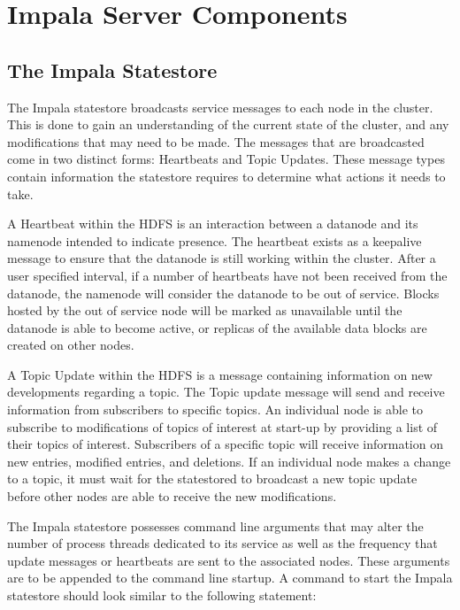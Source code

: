 \documentclass[onecolumn, draftclsnofoot,10pt, compsoc]{IEEEtran}
\begin{document}
\section{Impala Server Components}
\label{sec:impservcomp}
\subsection{The Impala Statestore}
The Impala statestore broadcasts service messages to each node in the cluster.
This is done to gain an understanding of the current state of the cluster, and any modifications that may need to be made.
The messages that are broadcasted come in two distinct forms: Heartbeats and Topic Updates.
These message types contain information the statestore requires to determine what actions it needs to take. 

A Heartbeat within the HDFS is an interaction between a datanode and its namenode intended to indicate presence.
The heartbeat exists as a keepalive message to ensure that the datanode is still working within the cluster.
After a user specified interval, if a number of heartbeats have not been received from the datanode, the namenode will consider the datanode to be out of service.
Blocks hosted by the out of service node will be marked as unavailable until the datanode is able to become active, or replicas of the available data blocks are created on other nodes.

A Topic Update within the HDFS is a message containing information on new developments regarding a topic.
The Topic update message will send and receive information from subscribers to specific topics.
An individual node is able to subscribe to modifications of topics of interest at start-up by providing a list of their topics of interest.
Subscribers of a specific topic will receive information on new entries, modified entries, and deletions.
If an individual node makes a change to a topic, it must wait for the statestored to broadcast a new topic update before other nodes are able to receive the new modifications. 


The Impala statestore possesses command line arguments that may alter the number of process threads dedicated to its service as well as the frequency that update messages or heartbeats are sent to the associated nodes.
These arguments are to be appended to the command line startup.
A command to start the Impala statestore should look similar to the following statement:
\end{document}
